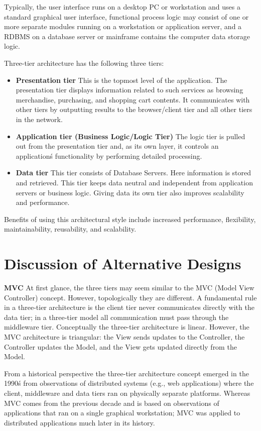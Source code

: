 \documentclass[salesmen, twoside]{../../../templates/latex/2009/softproj}
\begin{document}
\begin{projdoc}
Typically, the user interface runs on a desktop PC or workstation and uses a standard graphical user interface, functional process logic may consist of one or more separate modules running on a workstation or application server, and a RDBMS on a database server or mainframe contains the computer data storage logic.

Three-tier architecture has the following three tiers:
\begin{itemize}
\item \textbf{Presentation tier}
This is the topmost level of the application. The presentation tier displays information related to such services as browsing merchandise, purchasing, and shopping cart contents. It communicates with other tiers by outputting results to the browser/client tier and all other tiers in the network.
\item \textbf{Application tier (Business Logic/Logic Tier)}
The logic tier is pulled out from the presentation tier and, as its own layer, it controls an application\'s functionality by performing detailed processing.
\item \textbf{Data tier}
This tier consists of Database Servers. Here information is stored and retrieved. This tier keeps data neutral and independent from application servers or business logic. Giving data its own tier also improves scalability and performance. 
\end{itemize}

Benefits of using this architectural style include increased performance, flexibility, maintainability, reusability, and scalability.
\section{Discussion of Alternative Designs}
\textbf{MVC}
At first glance, the three tiers may seem similar to the MVC (Model View Controller) concept. However, topologically they are different. A fundamental rule in a three-tier architecture is the client tier never communicates directly with the data tier; in a three-tier model all communication must pass through the middleware tier. Conceptually the three-tier architecture is linear. However, the MVC architecture is triangular: the View sends updates to the Controller, the Controller updates the Model, and the View gets updated directly from the Model.

From a historical perspective the three-tier architecture concept emerged in the 1990\'s from observations of distributed systems (e.g., web applications) where the client, middleware and data tiers ran on physically separate platforms. Whereas MVC comes from the previous decade and is based on observations of applications that ran on a single graphical workstation; MVC was applied to distributed applications much later in its history.



\end{projdoc}
\end{document}
